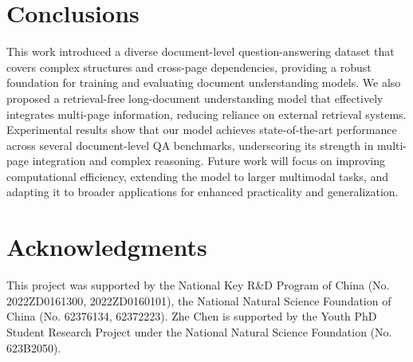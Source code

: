 \documentclass[10pt,twocolumn,letterpaper]{article}
\begin{document}
\begin{CJK}{UTF8}{gbsn}
\section{Conclusions}


This work introduced a diverse document-level question-answering dataset that covers complex structures and cross-page dependencies, providing a robust foundation for training and evaluating document understanding models. We also proposed a retrieval-free long-document understanding model that effectively integrates multi-page information, reducing reliance on external retrieval systems. Experimental results show that our model achieves state-of-the-art performance across several document-level QA benchmarks, underscoring its strength in multi-page integration and complex reasoning. Future work will focus on improving computational efficiency, extending the model to larger multimodal tasks, and adapting it to broader applications for enhanced practicality and generalization.

\section*{Acknowledgments}
This project was supported by the National Key R\&D Program of China (No. 2022ZD0161300, 2022ZD0160101), the National Natural Science Foundation of China (No. 62376134, 62372223). Zhe Chen is supported by the Youth PhD Student Research Project under the National Natural Science Foundation (No. 623B2050).

{
    \small
    
    
}



\end{CJK}
\end{document}
